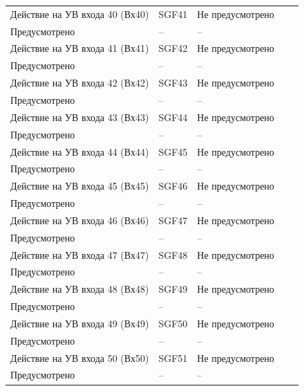 \begin{longtable}{|>{\centering\arraybackslash}m{5.3cm}|>{\centering\arraybackslash}m{3.3cm}|>{\centering\arraybackslash}m{4.2cm}|>{\centering\arraybackslash}m{1.8cm}|>{\centering\arraybackslash}m{1cm}|}
\hline
\centering Действие на УВ входа 40 (Вх40)  & \centering SGF41 & \centering Не предусмотрено \\ Предусмотрено & \centering -- & \centering \arraybackslash -- \\
\hline
\centering Действие на УВ входа 41 (Вх41)  & \centering SGF42 & \centering Не предусмотрено \\ Предусмотрено & \centering -- & \centering \arraybackslash -- \\
\hline
\centering Действие на УВ входа 42 (Вх42)  & \centering SGF43 & \centering Не предусмотрено \\ Предусмотрено & \centering -- & \centering \arraybackslash -- \\
\hline
\centering Действие на УВ входа 43 (Вх43)  & \centering SGF44 & \centering Не предусмотрено \\ Предусмотрено & \centering -- & \centering \arraybackslash -- \\
\hline
\centering Действие на УВ входа 44 (Вх44)  & \centering SGF45 & \centering Не предусмотрено \\ Предусмотрено & \centering -- & \centering \arraybackslash -- \\
\hline
\centering Действие на УВ входа 45 (Вх45)  & \centering SGF46 & \centering Не предусмотрено \\ Предусмотрено & \centering -- & \centering \arraybackslash -- \\
\hline
\centering Действие на УВ входа 46 (Вх46)  & \centering SGF47 & \centering Не предусмотрено \\ Предусмотрено & \centering -- & \centering \arraybackslash -- \\
\hline
\centering Действие на УВ входа 47 (Вх47)  & \centering SGF48 & \centering Не предусмотрено \\ Предусмотрено & \centering -- & \centering \arraybackslash -- \\
\hline
\centering Действие на УВ входа 48 (Вх48)  & \centering SGF49 & \centering Не предусмотрено \\ Предусмотрено & \centering -- & \centering \arraybackslash -- \\
\hline
\centering Действие на УВ входа 49 (Вх49)  & \centering SGF50 & \centering Не предусмотрено \\ Предусмотрено & \centering -- & \centering \arraybackslash -- \\
\hline
\centering Действие на УВ входа 50 (Вх50)  & \centering SGF51 & \centering Не предусмотрено \\ Предусмотрено & \centering -- & \centering \arraybackslash -- \\

\end{longtable}
